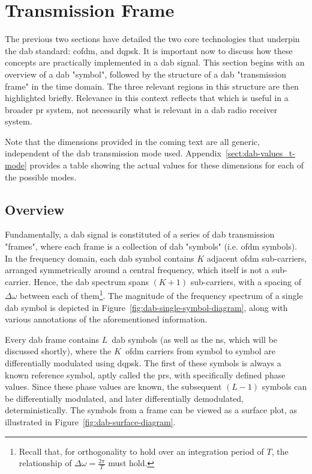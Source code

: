 \documentclass[class=report,11pt,crop=false]{standalone}
\begin{document}
\section{Transmission Frame}
The previous two sections have detailed the two core technologies that underpin the \gls{dab} standard: \gls{cofdm}, and \gls{dqpsk}. It is important now to discuss how these concepts are practically implemented in a \gls{dab} signal. This section begins with an overview of a \gls{dab} "symbol", followed by the structure of a \gls{dab} "transmission frame" in the time domain. The three relevant regions in this structure are then highlighted briefly. Relevance in this context reflects that which is useful in a broader \gls{pr} system, not necessarily what is relevant in a \gls{dab} radio receiver system.

Note that the dimensions provided in the coming text are all generic, independent of the \gls{dab} transmission mode used. Appendix~\ref{sect:dab-values_t-mode} provides a table showing the actual values for these dimensions for each of the possible modes.

\subsection{Overview}
Fundamentally, a \gls{dab} signal is constituted of a series of \gls{dab} transmission "frames", where each frame is a collection of \gls{dab} "symbols" (i.e. \gls{ofdm} symbols). In the frequency domain, each \gls{dab} symbol contains \(K\) adjacent \gls{ofdm} sub-carriers, arranged symmetrically around a central frequency, which itself is not a sub-carrier. Hence, the \gls{dab} spectrum spans \((K+1)\) sub-carriers, with a spacing of \(\Delta\omega\) between each of them\footnote{Recall that, for orthogonality to hold over an integration period of \(T\), the relationship of  \(\Delta\omega = \frac{2\pi}{T}\) must hold.}. The magnitude of the frequency spectrum of a single \gls{dab} symbol is depicted in Figure~\ref{fig:dab-single-symbol-diagram}, along with various annotations of the aforementioned information.

Every \gls{dab} frame contains \(L\)~\gls{dab} symbols (as well as the \gls{ns}, which will be discussed shortly), where the \(K\)~\gls{ofdm} carriers from symbol to symbol are differentially modulated using \gls{dqpsk}. The first of these symbols is always a known reference symbol, aptly called the \gls{prs}, with specifically defined phase values. Since these phase values are known, the subsequent \((L-1)\) symbols can be differentially modulated, and later differentially demodulated, deterministically. The symbols from a frame can be viewed as a surface plot, as illustrated in Figure~\ref{fig:dab-surface-diagram}.
\end{document}
